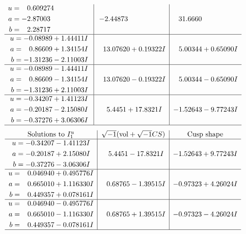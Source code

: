 \documentclass[1p]{elsarticle_modified}
\theoremstyle{definition}
\newcommand{\I}{\sqrt{-1}}
\begin{document}
$$\begin{array}{c|c|c}
\begin{aligned}
u &= \phantom{-}0.609274\phantom{ +0.000000I} \\
a &= -2.87003\phantom{ +0.000000I} \\
b &= \phantom{-}2.28717\phantom{ +0.000000I}\end{aligned}
 & -2.44873\phantom{ +0.000000I} & \phantom{-}31.6660\phantom{ +0.000000I} \\ \hline\begin{aligned}
u &= -0.08989 + 1.44411 I \\
a &= \phantom{-}0.86609 + 1.34154 I \\
b &= -1.31236 - 2.11003 I\end{aligned}
 & \phantom{-}13.07620 + 0.19322 I & \phantom{-}5.00344 + 0.65090 I \\ \hline\begin{aligned}
u &= -0.08989 - 1.44411 I \\
a &= \phantom{-}0.86609 - 1.34154 I \\
b &= -1.31236 + 2.11003 I\end{aligned}
 & \phantom{-}13.07620 - 0.19322 I & \phantom{-}5.00344 - 0.65090 I \\ \hline\begin{aligned}
u &= -0.34207 + 1.41123 I \\
a &= -0.20187 - 2.15080 I \\
b &= -0.37276 + 3.06306 I\end{aligned}
 & \phantom{-}5.4451 + 17.8321 I & -1.52643 - 9.77243 I\\
 \hline 
 \end{array}$$\newpage$$\begin{array}{c|c|c}  
\text{Solutions to }I^u_{1}& \I (\text{vol} + \sqrt{-1}CS) & \text{Cusp shape}\\
 \hline 
\begin{aligned}
u &= -0.34207 - 1.41123 I \\
a &= -0.20187 + 2.15080 I \\
b &= -0.37276 - 3.06306 I\end{aligned}
 & \phantom{-}5.4451 - 17.8321 I & -1.52643 + 9.77243 I \\ \hline\begin{aligned}
u &= \phantom{-}0.046940 + 0.495776 I \\
a &= \phantom{-}0.665010 + 1.116330 I \\
b &= \phantom{-}0.449357 + 0.078161 I\end{aligned}
 & \phantom{-}0.68765 - 1.39515 I & -0.97323 + 4.26024 I \\ \hline\begin{aligned}
u &= \phantom{-}0.046940 - 0.495776 I \\
a &= \phantom{-}0.665010 - 1.116330 I \\
b &= \phantom{-}0.449357 - 0.078161 I\end{aligned}
 & \phantom{-}0.68765 + 1.39515 I & -0.97323 - 4.26024 I\\
 \hline 
 \end{array}$$\newpage\newpage\renewcommand{\arraystretch}{1}
\end{document}
